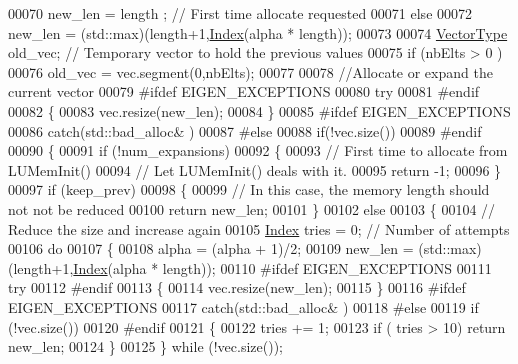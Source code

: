 \begin{DoxyCode}
00070     new\_len = length ; \textcolor{comment}{// First time allocate requested}
00071   \textcolor{keywordflow}{else} 
00072     new\_len = (std::max)(length+1,\hyperlink{namespace_eigen_a62e77e0933482dafde8fe197d9a2cfde}{Index}(alpha * length));
00073   
00074   \hyperlink{struct_vector_type}{VectorType} old\_vec; \textcolor{comment}{// Temporary vector to hold the previous values   }
00075   \textcolor{keywordflow}{if} (nbElts > 0 )
00076     old\_vec = vec.segment(0,nbElts); 
00077   
00078   \textcolor{comment}{//Allocate or expand the current vector}
00079 \textcolor{preprocessor}{#ifdef EIGEN\_EXCEPTIONS}
00080   \textcolor{keywordflow}{try}
00081 \textcolor{preprocessor}{#endif}
00082   \{
00083     vec.resize(new\_len); 
00084   \}
00085 \textcolor{preprocessor}{#ifdef EIGEN\_EXCEPTIONS}
00086   \textcolor{keywordflow}{catch}(std::bad\_alloc& )
00087 \textcolor{preprocessor}{#else}
00088   \textcolor{keywordflow}{if}(!vec.size())
00089 #endif
00090   \{
00091     \textcolor{keywordflow}{if} (!num\_expansions)
00092     \{
00093       \textcolor{comment}{// First time to allocate from LUMemInit()}
00094       \textcolor{comment}{// Let LUMemInit() deals with it.}
00095       \textcolor{keywordflow}{return} -1;
00096     \}
00097     \textcolor{keywordflow}{if} (keep\_prev)
00098     \{
00099       \textcolor{comment}{// In this case, the memory length should not not be reduced}
00100       \textcolor{keywordflow}{return} new\_len;
00101     \}
00102     \textcolor{keywordflow}{else} 
00103     \{
00104       \textcolor{comment}{// Reduce the size and increase again }
00105       \hyperlink{namespace_eigen_a62e77e0933482dafde8fe197d9a2cfde}{Index} tries = 0; \textcolor{comment}{// Number of attempts}
00106       \textcolor{keywordflow}{do} 
00107       \{
00108         alpha = (alpha + 1)/2;
00109         new\_len = (std::max)(length+1,\hyperlink{namespace_eigen_a62e77e0933482dafde8fe197d9a2cfde}{Index}(alpha * length));
00110 \textcolor{preprocessor}{#ifdef EIGEN\_EXCEPTIONS}
00111         \textcolor{keywordflow}{try}
00112 \textcolor{preprocessor}{#endif}
00113         \{
00114           vec.resize(new\_len); 
00115         \}
00116 \textcolor{preprocessor}{#ifdef EIGEN\_EXCEPTIONS}
00117         \textcolor{keywordflow}{catch}(std::bad\_alloc& )
00118 \textcolor{preprocessor}{#else}
00119         \textcolor{keywordflow}{if} (!vec.size())
00120 #endif
00121         \{
00122           tries += 1; 
00123           \textcolor{keywordflow}{if} ( tries > 10) \textcolor{keywordflow}{return} new\_len; 
00124         \}
00125       \} \textcolor{keywordflow}{while} (!vec.size());

\end{DoxyCode}

